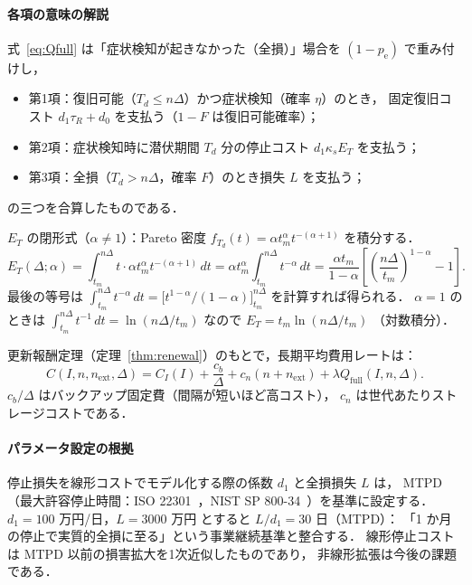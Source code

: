 \documentclass[12pt,a4paper]{article}
\theoremstyle{plain}
\theoremstyle{definition}
\theoremstyle{remark}
\newcommand{\pe}{p_{\mathrm{e}}}
\newcommand{\Qf}{Q_{\mathrm{full}}}
\begin{document}
\paragraph{各項の意味の解説}
式~\eqref{eq:Qfull} は「症状検知が起きなかった（全損）」場合を $(1-\pe)$ で重み付けし，
\begin{itemize}[leftmargin=2em]
\item 第1項：復旧可能（$T_d\le n\Delta$）かつ症状検知（確率 $\eta$）のとき，
  固定復旧コスト $d_1\tau_R+d_0$ を支払う（$1-F$ は復旧可能確率）；
\item 第2項：症状検知時に潜伏期間 $T_d$ 分の停止コスト $d_1\kappa_s E_T$ を支払う；
\item 第3項：全損（$T_d>n\Delta$，確率 $F$）のとき損失 $L$ を支払う；
\end{itemize}
の三つを合算したものである．

\medskip
$E_T$ の閉形式（$\alpha\ne1$）：Pareto 密度 $f_{T_d}(t)=\alpha t_m^\alpha t^{-(\alpha+1)}$ を積分する．
\begin{equation}\label{eq:ET}
E_T(\Delta;\alpha)
=\int_{t_m}^{n\Delta} t\cdot\alpha t_m^\alpha t^{-(\alpha+1)}\,dt
=\alpha t_m^\alpha\int_{t_m}^{n\Delta}t^{-\alpha}\,dt
=\frac{\alpha t_m}{1-\alpha}\!\left[\!\left(\frac{n\Delta}{t_m}\right)^{\!1-\alpha}\!-1\right].
\end{equation}
最後の等号は $\int_{t_m}^{n\Delta}t^{-\alpha}\,dt=\bigl[t^{1-\alpha}/(1-\alpha)\bigr]_{t_m}^{n\Delta}$
を計算すれば得られる．
$\alpha=1$ のときは $\int_{t_m}^{n\Delta}t^{-1}\,dt=\ln(n\Delta/t_m)$ なので
$E_T=t_m\ln(n\Delta/t_m)$ （対数積分）．

更新報酬定理（定理~\ref{thm:renewal}）のもとで，長期平均費用レートは：
\begin{equation}\label{eq:cost_rate}
C(I,n,n_{\mathrm{ext}},\Delta)
= C_I(I)+\frac{c_b}{\Delta}+c_n(n+n_{\mathrm{ext}})+\lambda\Qf(I,n,\Delta).
\end{equation}
$c_b/\Delta$ はバックアップ固定費（間隔が短いほど高コスト），
$c_n$ は世代あたりストレージコストである．

\paragraph{パラメータ設定の根拠}
停止損失を線形コストでモデル化する際の係数 $d_1$ と全損損失 $L$ は，
MTPD（最大許容停止時間：ISO 22301~\cite{iso22301}，NIST SP 800-34~\cite{nist80034}）を基準に設定する．
$d_1=100$ 万円/日，$L=3000$ 万円 とすると $L/d_1=30$ 日（MTPD）：
「1 か月の停止で実質的全損に至る」という事業継続基準と整合する．
線形停止コストは MTPD 以前の損害拡大を1次近似したものであり，
非線形拡張は今後の課題である．
\end{document}
